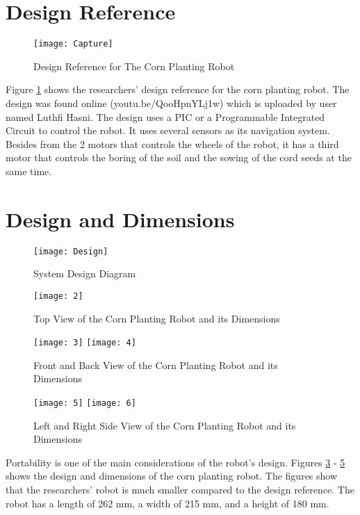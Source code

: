 \section{Design Reference}

\begin{figure}[!htbp]
	\centering
		\texttt{[image: Capture]}
	\caption{Design Reference for The Corn Planting Robot}
	\label{fig:reference}
\end{figure}

Figure \ref{fig:reference} shows the researchers’ design reference for the corn planting robot. The design was found online (youtu.be/QooHpnYLj1w) which is uploaded by user named Luthfi Hasni. The design uses a PIC or a Programmable Integrated Circuit to control the robot. It uses several sensors as its navigation system. Besides from the 2 motors that controls the wheels of the robot, it has a third motor that controls the boring of the soil and the sowing of the cord seeds at the same time. 

\section{Design and Dimensions}

\begin{figure}[!htbp]
	\centering
		\texttt{[image: Design]}
	\caption{System Design Diagram}
	\label{fig:Design}
\end{figure}

\begin{figure}[!htbp]
	\centering
		\texttt{[image: 2]}
	\caption{Top View of the Corn Planting Robot and its Dimensions}
	\label{fig:1}
\end{figure}

\begin{figure}[!htbp]
	\centering
		\texttt{[image: 3]}
		\texttt{[image: 4]}
	\caption{Front and Back View of the Corn Planting Robot and its Dimensions}
	\label{fig:2}
\end{figure}

\begin{figure}[!htbp]
	\centering
		\texttt{[image: 5]}
		\texttt{[image: 6]}
	\caption{Left and Right Side View of the Corn Planting Robot and its Dimensions}
	\label{fig:3}
\end{figure}

Portability is one of the main considerations of the robot’s design. Figures \ref{fig:1} - \ref{fig:3} shows the design and dimensions of the corn planting robot. The figures show that the researchers’ robot is much smaller compared to the design reference. The robot has a length of 262 mm, a width of 215 mm, and a height of 180 mm.

